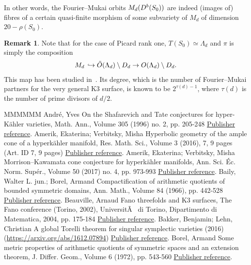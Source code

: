 \documentclass[11pt]{article}
\theoremstyle{definition}
\newtheorem{rema}[theo]{Remark}
\numberwithin{equation}{section}
\numberwithin{figure}{section}
\numberwithin{table}{section}
\newcommand{\Db}{{\rm D}^{\rm b}}
\newcommand{\OO}{{\rm O}}
\renewcommand{\cong}{\simeq}
\begin{document}
In other words, the Fourier--Mukai orbits $M_d(\Db(S_0))$ are indeed (images of) fibres of a certain quasi-finite morphism of some subvariety of $M_d$ of dimension~$20-\rho(S_0)$.


\begin{rema}
Note that for the case of Picard rank one, $T(S_0)\cong\Lambda_d$ and $\pi$ is simply the composition
\[
M_d\,\hookrightarrow \tilde \OO(\Lambda_d)\setminus D_d\to \OO(\Lambda_d)\setminus D_d.
\]
This map has been studied in~\cite{Hosono,Og,Stel}. Its degree, which is the number of Fourier--Mukai partners for the very general K3 surface, is known to be $2^{\tau(d)-1}$, where $\tau(d)$ is the number of prime divisors of $d/2$.
\end{rema}



\begin{thebibliography}{MMMMMM}
 André, Yves On the Shafarevich and Tate conjectures for hyper-Kähler varieties, Math. Ann., Volume 305 (1996) no. 2, pp. 205-248 \href{https://ahl.centre-mersenne.org/item/AHL_2018__1__227_0/#Andre}{Publisher reference}.
 Amerik, Ekaterina; Verbitsky, Misha Hyperbolic geometry of the ample cone of a hyperkähler manifold, Res. Math. Sci., Volume 3 (2016), 7, 9 pages (Art. ID 7, 9 pages) \href{https://ahl.centre-mersenne.org/item/AHL_2018__1__227_0/#AmVerb2}{Publisher reference}.
 Amerik, Ekaterina; Verbitsky, Misha Morrison–Kawamata cone conjecture for hyperkähler manifolds, Ann. Sci. Éc. Norm. Supér., Volume 50 (2017) no. 4, pp. 973-993 \href{https://ahl.centre-mersenne.org/item/AHL_2018__1__227_0/#AmVerb}{Publisher reference}.
 Baily, Walter L. jun.; Borel, Armand Compactification of arithmetic quotients of bounded symmetric domains, Ann. Math., Volume 84 (1966), pp. 442-528 \href{https://ahl.centre-mersenne.org/item/AHL_2018__1__227_0/#BB}{Publisher reference}.
 Beauville, Arnaud Fano threefolds and K3 surfaces, The Fano conference (Torino, 2002), UniversitÃ  di Torino, Dipartimento di Matematica, 2004, pp. 175-184 \href{https://ahl.centre-mersenne.org/item/AHL_2018__1__227_0/#Beauv}{Publisher reference}.
 Bakker, Benjamin; Lehn, Christian A global Torelli theorem for singular symplectic varieties (2016) (\url{https://arxiv.org/abs/1612.07894}) \href{https://ahl.centre-mersenne.org/item/AHL_2018__1__227_0/#BL}{Publisher reference}.
 Borel, Armand Some metric properties of arithmetic quotients of symmetric spaces and an extension theorem, J. Differ. Geom., Volume 6 (1972), pp. 543-560 \href{https://ahl.centre-mersenne.org/item/AHL_2018__1__227_0/#Bor}{Publisher reference}.

\end{thebibliography}
\end{document}
